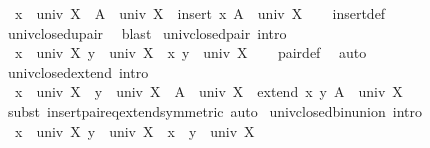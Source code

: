 \begin{isabellebody}
\ \ {\isachardoublequoteopen}x\ {\isasymin}\ univ\ X\ {\isasymLongrightarrow}\ A\ {\isasymin}\ univ\ X\ {\isasymLongrightarrow}\ insert\ x\ A\ {\isasymin}\ univ\ X{\isachardoublequoteclose}\isanewline
%
\isadelimproof
\ \ %
\endisadelimproof
%
\isatagproof
{}\isamarkupfalse%
\ insert{\isacharunderscore}{\kern0pt}def\ \isamarkupfalse%
\ univ{\isacharunderscore}{\kern0pt}closed{\isacharunderscore}{\kern0pt}upair\ \isamarkupfalse%
\ blast%
\endisatagproof
{\isafoldproof}%
%
\isadelimproof
\isanewline
%
\endisadelimproof
\isanewline
{}\isamarkupfalse%
\ univ{\isacharunderscore}{\kern0pt}closed{\isacharunderscore}{\kern0pt}pair\ {\isacharbrackleft}{\kern0pt}intro{\isacharbang}{\kern0pt}{\isacharbrackright}{\kern0pt}{\isacharcolon}{\kern0pt}\isanewline
\ \ {\isachardoublequoteopen}{\isasymlbrakk}x\ {\isasymin}\ univ\ X{\isacharsemicolon}{\kern0pt}\ y\ {\isasymin}\ univ\ X{\isasymrbrakk}\ {\isasymLongrightarrow}\ {\isasymlangle}x{\isacharcomma}{\kern0pt}\ y{\isasymrangle}\ {\isasymin}\ univ\ X{\isachardoublequoteclose}\isanewline
%
\isadelimproof
\ \ %
\endisadelimproof
%
\isatagproof
{}\isamarkupfalse%
\ pair{\isacharunderscore}{\kern0pt}def\ \isamarkupfalse%
\ auto%
\endisatagproof
{\isafoldproof}%
%
\isadelimproof
\isanewline
%
\endisadelimproof
\isanewline
{}\isamarkupfalse%
\ univ{\isacharunderscore}{\kern0pt}closed{\isacharunderscore}{\kern0pt}extend\ {\isacharbrackleft}{\kern0pt}intro{\isacharbang}{\kern0pt}{\isacharbrackright}{\kern0pt}{\isacharcolon}{\kern0pt}\isanewline
\ \ {\isachardoublequoteopen}x\ {\isasymin}\ univ\ X\ {\isasymLongrightarrow}\ y\ {\isasymin}\ univ\ X\ {\isasymLongrightarrow}\ A\ {\isasymin}\ univ\ X\ {\isasymLongrightarrow}\ extend\ x\ y\ A\ {\isasymin}\ univ\ X{\isachardoublequoteclose}\isanewline
%
\isadelimproof
\ \ %
\endisadelimproof
%
\isatagproof
{}\isamarkupfalse%
\ {\isacharparenleft}{\kern0pt}subst\ insert{\isacharunderscore}{\kern0pt}pair{\isacharunderscore}{\kern0pt}eq{\isacharunderscore}{\kern0pt}extend{\isacharbrackleft}{\kern0pt}symmetric{\isacharbrackright}{\kern0pt}{\isacharparenright}{\kern0pt}\ auto%
\endisatagproof
{\isafoldproof}%
%
\isadelimproof
\isanewline
%
\endisadelimproof
\isanewline
{}\isamarkupfalse%
\ univ{\isacharunderscore}{\kern0pt}closed{\isacharunderscore}{\kern0pt}bin{\isacharunderscore}{\kern0pt}union\ {\isacharbrackleft}{\kern0pt}intro{\isacharbang}{\kern0pt}{\isacharbrackright}{\kern0pt}{\isacharcolon}{\kern0pt}\isanewline
\ \ {\isachardoublequoteopen}{\isasymlbrakk}x\ {\isasymin}\ univ\ X{\isacharsemicolon}{\kern0pt}\ y\ {\isasymin}\ univ\ X{\isasymrbrakk}\ {\isasymLongrightarrow}\ x\ {\isasymunion}\ y\ {\isasymin}\ univ\ X{\isachardoublequoteclose}\isanewline

\end{isabellebody}
